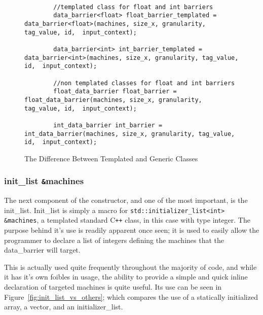 \documentclass[../thesis.tex]{subfiles}
\begin{document}
    \begin{figure}[htbp]
      \centering

      \lstset{language=cpp}  
      \begin{lstlisting}[tabsize=2]

        //templated class for float and int barriers
        data_barrier<float> float_barrier_templated = data_barrier<float>(machines, size_x, granularity, tag_value, id,  input_context);

        data_barrier<int> int_barrier_templated = data_barrier<int>(machines, size_x, granularity, tag_value, id,  input_context);

        //non templated classes for float and int barriers
        float_data_barrier float_barrier = float_data_barrier(machines, size_x, granularity, tag_value, id,  input_context);

        int_data_barrier int_barrier = int_data_barrier(machines, size_x, granularity, tag_value, id,  input_context);
        \end{lstlisting}

      \caption{The Difference Between Templated and Generic Classes}
      \label{fig:templated_vs_non_templated}
    \end{figure}
  
  \subsubsection{init\_list \texttt{\&}machines} %
  \label{ssub:init_list}
    The next component of the constructor, and one of the most important, is the init\_list. Init\_list is simply a macro for \newline\texttt{std::initializer\_list<int> \&machines}, a templated standard C\texttt{++} class, in this case with type integer. The purpose behind it's use is readily apparent once seen; it is used to easily allow the programmer to declare a list of integers defining the machines that the data\_barrier will target.

    This is actually used quite frequently throughout the majority of code, and while it has it's own foibles in usage, the ability to provide a simple and quick inline declaration of targeted machines is quite useful. Its use can be seen in Figure~\ref{fig:init_list_vs_others}; which compares the use of a statically initialized array, a vector, and an initializer\_list.
\end{document}

